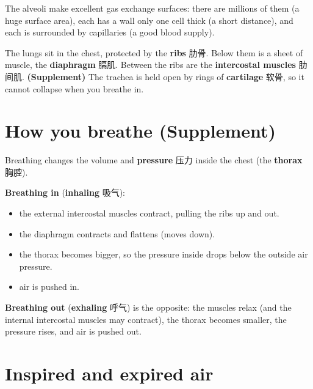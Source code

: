 \documentclass[11pt]{article}
\begin{document}
The alveoli make excellent gas exchange surfaces: there are millions of them (a huge surface area), each has a wall only one cell thick (a short distance), and each is surrounded by capillaries (a good blood supply).

The lungs sit in the chest, protected by the \textbf{ribs} 肋骨. Below them is a sheet of muscle, the \textbf{diaphragm} 膈肌. Between the ribs are the \textbf{intercostal muscles} 肋间肌. \textbf{(Supplement)} The trachea is held open by rings of \textbf{cartilage} 软骨, so it cannot collapse when you breathe in.

\section*{How you breathe (Supplement)}

Breathing changes the volume and \textbf{pressure} 压力 inside the chest (the \textbf{thorax} 胸腔).

\textbf{Breathing in} (\textbf{inhaling} 吸气):

\begin{itemize}
\item the external intercostal muscles contract, pulling the ribs up and out.

\item the diaphragm contracts and flattens (moves down).

\item the thorax becomes bigger, so the pressure inside drops below the outside air pressure.

\item air is pushed in.

\end{itemize}

\textbf{Breathing out} (\textbf{exhaling} 呼气) is the opposite: the muscles relax (and the internal intercostal muscles may contract), the thorax becomes smaller, the pressure rises, and air is pushed out.

\section*{Inspired and expired air}

\begin{center}
\end{center}
\end{document}
